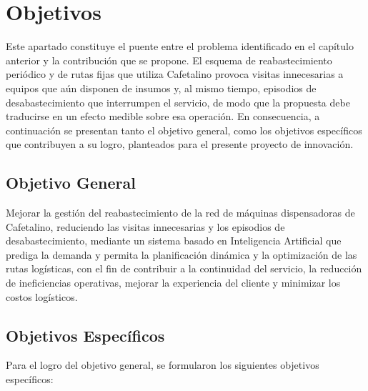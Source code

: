 \section{Objetivos}\label{objetivos}

Este apartado constituye el puente entre el problema identificado en el capítulo anterior y la contribución que se propone. El esquema de reabastecimiento periódico y de rutas fijas que utiliza Cafetalino provoca visitas innecesarias a equipos que aún disponen de insumos y, al mismo tiempo, episodios de desabastecimiento que interrumpen el servicio, de modo que la propuesta debe traducirse en un efecto medible sobre esa operación. En consecuencia, a continuación se presentan tanto el objetivo general, como los objetivos específicos que contribuyen a su logro, planteados para el presente proyecto de innovación.

\subsection{Objetivo General}\label{objetivo-general}

Mejorar la gestión del reabastecimiento de la red de máquinas dispensadoras de Cafetalino, reduciendo las visitas innecesarias y los episodios de desabastecimiento, mediante un sistema basado en Inteligencia Artificial que prediga la demanda y permita la planificación dinámica y la optimización de las rutas logísticas, con el fin de contribuir a la continuidad del servicio, la reducción de ineficiencias operativas, mejorar la experiencia del cliente y minimizar los costos logísticos.

\subsection{Objetivos Específicos}\label{objetivos-especuxedficos}

Para el logro del objetivo general, se formularon los siguientes objetivos específicos:

